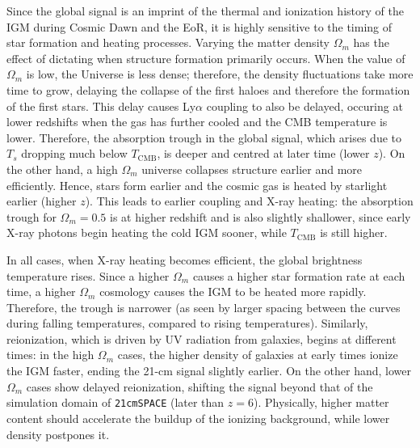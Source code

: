 \documentclass[floats,floatfix,showpacs,amssymb,prd,superscriptaddress,nofootinbib, 11pt]{revtex4-2} %
\newcommand{\code}{\texttt}
\begin{document}
Since the global signal is an imprint of the thermal and ionization history of the IGM during Cosmic Dawn and the EoR, it is highly sensitive to the timing of star formation and heating processes. Varying the matter density $\Omega_m$ has the effect of dictating when structure formation primarily occurs. When the value of $\Omega_m$ is low, the Universe is less dense; therefore, the density fluctuations take more time to grow, delaying the collapse of the first haloes and therefore the formation of the first stars. This delay causes Ly$\alpha$ coupling to also be delayed, occuring at lower redshifts when the gas has further cooled and the CMB temperature is lower. Therefore, the absorption trough in the global signal, which arises due to $T_s$ dropping much below $T_\text{CMB}$, is deeper and centred at later time (lower $z$). On the other hand, a high $\Omega_m$ universe collapses structure earlier and more efficiently. Hence, stars form earlier and the cosmic gas is heated by starlight earlier (higher $z$). This leads to earlier coupling and X-ray heating: the absorption trough for $\Omega_m = 0.5$ is at higher redshift and is also slightly shallower, since early X-ray photons begin heating the cold IGM sooner, while $T_\text{CMB}$ is still higher. 

In all cases, when X-ray heating becomes efficient, the global brightness temperature rises. Since a higher $\Omega_m$ causes a higher star formation rate at each time, a higher $\Omega_m$ cosmology causes the IGM to be heated more rapidly. Therefore, the trough is narrower (as seen by larger spacing between the curves during falling temperatures, compared to rising temperatures). Similarly, reionization, which is driven by UV radiation from galaxies, begins at different times: in the high $\Omega_m$ cases, the higher density of galaxies at early times ionize the IGM faster, ending the 21-cm signal slightly earlier. On the other hand, lower $\Omega_m$ cases show delayed reionization, shifting the signal beyond that of the simulation domain of \code{21cmSPACE} (later than $z = 6$). Physically, higher matter content should accelerate the buildup of the ionizing background, while lower density postpones it.
\end{document}
